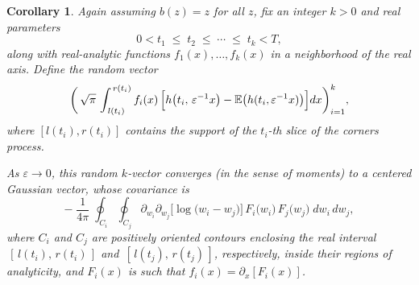 \documentclass[letterpaper,11pt,oneside,reqno]{book}
\numberwithin{equation}{chapter}  %
\newcommand{\ssp}{\hspace{1pt}}
\newtheorem{corollary}[proposition]{Corollary}
\theoremstyle{definition}
\begin{document}
\begin{corollary}
\label{lecture9:cor:corollary6.9-specialized}
Again assuming \(b(z)=z\) for all \(z\), fix an integer \(k>0\) and real parameters
\[
0 < t_1 \;\le\; t_2 \;\le\;\cdots\;\le\; t_k < T,
\]
along with real-analytic functions \(f_1(x),\ldots,f_k(x)\) in a neighborhood of the real axis.  Define the random vector
\[
\biggl(\,
\sqrt{\pi}\,\int_{\,l(t_i)}^{\,r(t_i)}
f_i(x)\,\Bigl[
h\bigl(t_i,\,\varepsilon^{-1}x\bigr)
-\mathbb{E}\bigl(h(t_i,\varepsilon^{-1}x)\bigr)
\Bigr]\!\,dx
\biggr)_{i=1}^k,
\]
where $[l(t_i),r(t_i)]$ contains the support of the $t_i$-th slice of the corners process.

As \(\varepsilon \to 0\), this random \(k\)-vector converges (in the sense of moments) to a centered Gaussian vector, whose covariance is
\[
-\;\frac{1}{4\pi}
\;\oint_{C_i}\!\oint_{C_j}\!
\partial_{w_i}\partial_{w_j}
\bigl[\log\bigl(w_i - w_j\bigr)\bigr]\,
F_i\bigl(w_i\bigr)\,F_j\bigl(w_j\bigr)
\;dw_i\,dw_j,
\]
where \(C_i\) and \(C_j\) are positively oriented contours enclosing the real interval \(\,[\,l(t_i),\,r(t_i)\,]\) and \(\,[\,l(t_j),\,r(t_j)\,]\), respectively, inside their regions of analyticity, and \(F_i(x)\) is such that \(f_i(x)=\partial_x[F_i(x)]\).
\end{corollary}






%
%
%
\end{document}
